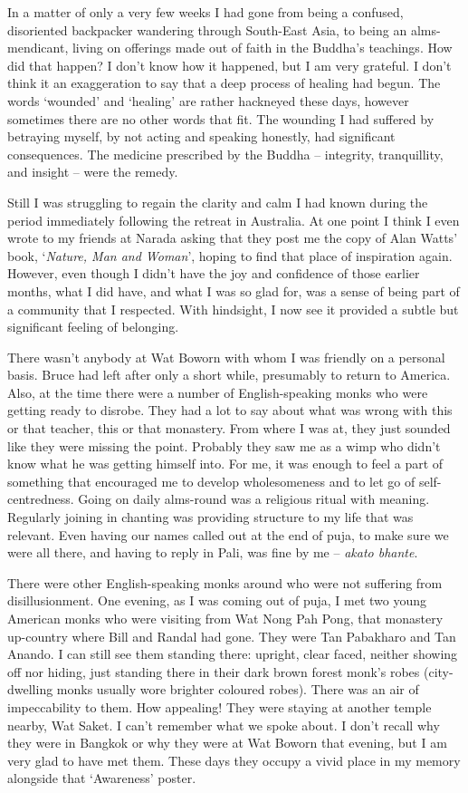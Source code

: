 In a matter of only a very few weeks I had gone from being a confused,
disoriented backpacker wandering through South-East Asia, to being an
alms-mendicant, living on offerings made out of faith in the Buddha's
teachings. How did that happen? I don't know how it happened, but I am
very grateful. I don't think it an exaggeration to say that a deep
process of healing had begun. The words `wounded' and `healing' are
rather hackneyed these days, however sometimes there are no other words
that fit. The wounding I had suffered by betraying myself, by not acting
and speaking honestly, had significant consequences. The medicine
prescribed by the Buddha -- integrity, tranquillity, and insight -- were
the remedy.

Still I was struggling to regain the clarity and calm I had known during
the period immediately following the retreat in Australia. At one point
I think I even wrote to my friends at Narada asking that they post me
the copy of Alan Watts' book, `\emph{Nature, Man and Woman}', hoping to
find that place of inspiration again. However, even though I didn't have
the joy and confidence of those earlier months, what I did have, and
what I was so glad for, was a sense of being part of a community that I
respected. With hindsight, I now see it provided a subtle but
significant feeling of belonging.

There wasn't anybody at Wat Boworn with whom I was friendly on a
personal basis. Bruce had left after only a short while, presumably to
return to America. Also, at the time there were a number of
English-speaking monks who were getting ready to disrobe. They had a lot
to say about what was wrong with this or that teacher, this or that
monastery. From where I was at, they just sounded like they were missing
the point. Probably they saw me as a wimp who didn't know what he was
getting himself into. For me, it was enough to feel a part of something
that encouraged me to develop wholesomeness and to let go of
self-centredness. Going on daily alms-round was a religious ritual with
meaning. Regularly joining in chanting was providing structure to my
life that was relevant. Even having our names called out at the end of
puja, to make sure we were all there, and having to reply in
Pali, was fine by me -- \emph{akato bhante}.

There were other English-speaking monks around who were not suffering
from disillusionment. One evening, as I was coming out of puja, I met
two young American monks who were visiting from Wat Nong Pah Pong, that
monastery up-country where Bill and Randal had gone. They were Tan
Pabakharo and Tan Anando. I can still see them standing there: upright,
clear faced, neither showing off nor hiding, just standing there in
their dark brown forest monk's robes (city-dwelling monks usually wore
brighter coloured robes). There was an air of impeccability to them. How
appealing! They were staying at another temple nearby, Wat Saket. I
can't remember what we spoke about. I don't recall why they were in
Bangkok or why they were at Wat Boworn that evening, but I am very glad
to have met them. These days they occupy a vivid place in my memory
alongside that `Awareness' poster.


